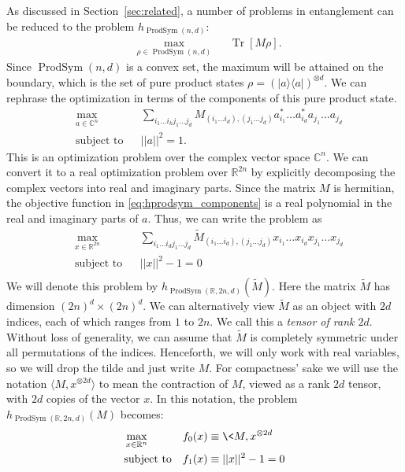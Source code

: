 \documentclass[aps,pra,notitlepage,preprintnumbers,11pt,tightenlines]{revtex4-1}
\newcommand{\bra}[1]{\langle #1 |}
\newcommand{\ket}[1]{| #1 \rangle}
\newcommand{\CC}{\mathbb{C}}
\newcommand{\RR}{\mathbb{R}}
\newcommand{\ot}{\otimes}
\DeclareMathOperator{\ProdSym}{ProdSym}
\DeclareMathOperator{\Tr}{Tr}
\begin{document}
As discussed in Section~\ref{sec:related}, a number of problems in entanglement can be
reduced to the problem $h_{\ProdSym(n,d)}$: 
\begin{equation}
  \label{eq:hprodsym_density}
  \begin{aligned}
    &\max_{\rho \in \ProdSym(n,d)} && \Tr[M \rho].
  \end{aligned} 
\end{equation}
Since $\ProdSym(n,d)$ is a convex set, the maximum will be attained on
the boundary, which is the set of pure product states $\rho = (\ket{a}
\bra{a})^{ \otimes d}$. We can rephrase the optimization in terms of
the components of this pure product state.
\begin{equation}
\label{eq:hprodsym_components}
\begin{aligned}
  &\max_{a \in  \CC^n} && \sum_{i_1 \dots i_k j_1 \dots j_d} M_{(i_1
    \dots i_d), (j_1 \dots j_d)} a_{i_1}^* \dots a_{i_d}^*  a_{j_1} \dots a_{j_d}  \\
  &\text{subject to} && ||a||^2 =1.
\end{aligned}
\end{equation}
This is an optimization problem over the complex vector space $\CC^n$. We can
convert it to a real optimization problem over $\RR^{2n}$ by explicitly decomposing
the complex vectors into real and imaginary parts. Since the matrix
$M$ is hermitian, the objective function in
\eqref{eq:hprodsym_components} is a real polynomial in the real and imaginary parts
of $a$. Thus, we can write the problem as
\begin{equation}
  \label{eq:hprodsym_complex}
  \begin{aligned}
  &\max_{x \in \RR^{2n}} & & \sum_{i_1 \dots i_d j_1 \dots j_d} \tilde{M}_{(i_1 \dots i_d),( j_1 \dots j_d)}
  x_{i_1} \dots x_{i_d} x_{j_1} \dots x_{j_d} \\
  &\text{subject to} & & ||x||^2 -1 = 0 \\
\end{aligned}
\end{equation}
We will denote this problem by $h_{\ProdSym(\RR, 2n, d)}(\tilde{M})$. Here the matrix $\tilde{M}$ has dimension $(2n)^d \times
(2n)^d$. We can alternatively view $\tilde{M}$ as an object with $2d$
indices, each of which ranges from $1$ to $2n$. We call this a
\emph{tensor of rank $2d$}. Without loss of generality, we
can assume that $\tilde{M}$ is completely symmetric under all permutations of
the indices. Henceforth, we will only work with real variables, so we
will drop the tilde and just write $M$. For compactness' sake we will use the
notation $\langle M,x^{\ot 2d}\rangle$ to mean the contraction of $M$, viewed as a rank
$2d$ tensor, with $2d$ copies of the vector $x$. In this notation, the problem
$h_{\ProdSym(\RR, 2n, d)}(M)$ becomes:
\begin{equation}
  \label{eq:hprodsym}
  \begin{aligned}
  &\max_{x \in \RR^n} & & f_0(x) \equiv \< M,  x^{\ot 2d}\> \\
  &\text{subject to} & & f_1(x) \equiv ||x||^2 -1 = 0 \\
\end{aligned}
\end{equation}
\end{document}
